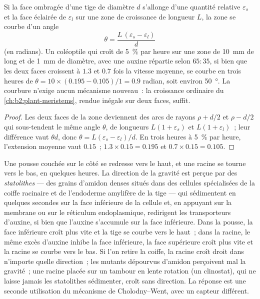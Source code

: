 \begin{theorem}\label{thm:b2:plant-plasticity:bend}
Si la face ombragée d'une tige de diamètre $d$ s'allonge d'une quantité
relative $\varepsilon_s$ et la face éclairée de $\varepsilon_l$ sur une
zone de croissance de longueur $L$, la zone se courbe d'un angle
\[
\theta = \frac{L\,(\varepsilon_s - \varepsilon_l)}{d}
\]
(en radians). Un coléoptile qui croît de \qty{5}{\%} par heure sur une
zone de \qty{10}{mm} de long et de \qty{1}{mm} de diamètre, avec une
auxine répartie selon
$65 : 35$, si bien que les deux faces croissent à $1.3$ et $0.7$ fois
la vitesse moyenne, se courbe en trois heures de
$\theta = 10\times(0.195 - 0.105)/1 =
0.9$ radian, soit environ \qty{50}{\degree}. La courbure n'exige aucun
mécanisme nouveau~: la croissance ordinaire du
\cref{ch:b2:plant-meristems}, rendue inégale sur deux faces, suffit.
\end{theorem}
\begin{proof}
Les deux faces de la zone deviennent des arcs de rayons $\rho + d/2$ et
$\rho - d/2$ qui sous-tendent le même angle $\theta$, de longueurs $L(1 +
\varepsilon_s)$ et $L(1 + \varepsilon_l)$~; leur différence vaut
$\theta d$, donc $\theta = L(\varepsilon_s - \varepsilon_l)/d$. En trois
heures à \qty{5}{\%} par heure, l'extension moyenne vaut $0.15$~;
$1.3\times 0.15 = 0.195$ et $0.7\times 0.15 = 0.105$.
\end{proof}

\begin{proposition}[Le gravitropisme]\label{prop:b2:plant-plasticity:gravitropism}
Une pousse couchée sur le côté se redresse vers le haut, et une racine
se tourne vers le bas, en quelques heures. La direction de la gravité
est perçue par des \emph{statolithes} --- des grains d'amidon denses
situés dans des cellules spécialisées de la coiffe racinaire et de
l'endoderme amylifère de la tige --- qui sédimentent en quelques secondes
sur la face inférieure de la cellule et, en appuyant sur la membrane ou
sur le réticulum endoplasmique, redirigent les transporteurs d'auxine,
si bien que l'auxine s'accumule sur la face inférieure. Dans la pousse,
la face inférieure croît plus vite et la tige se courbe vers le haut~;
dans la racine, le même excès d'auxine inhibe la face inférieure, la
face supérieure croît plus vite et la racine se courbe vers le bas. Si
l'on retire la coiffe, la racine croît droit dans n'importe quelle
direction~; les mutants dépourvus d'amidon perçoivent mal la gravité~;
une racine placée sur un tambour en lente rotation (un clinostat), qui
ne laisse jamais les statolithes sédimenter, croît sans direction. La
réponse est une seconde utilisation du mécanisme de Cholodny--Went, avec
un capteur différent.
\end{proposition}

